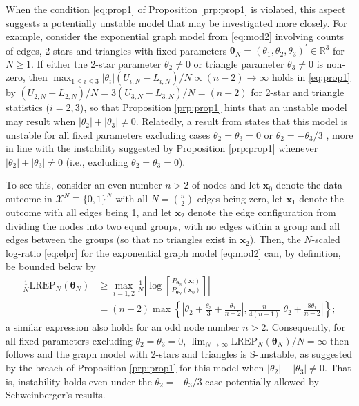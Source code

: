 \documentclass[numbib]{imamat}
\theoremstyle{theorem}
\theoremstyle{lemma}
\theoremstyle{example}
\theoremstyle{corollary}
\theoremstyle{definition}
\theoremstyle{remark}
\theoremstyle{approximation}
\theoremstyle{scheme}
\newcommand{\REP}{\mathrm{LREP}}
\newcommand{\ak}[1]{{\color{blue} #1}}
\begin{document}
When the condition \eqref{eq:prop1} of Proposition \ref{prp:prop1} is violated, this aspect suggests a potentially unstable model that may be investigated more closely. For example, consider the exponential graph model from \eqref{eq:mod2} involving counts of edges, 2-stars and triangles with fixed parameters \(\boldsymbol \theta_N = (\theta_{1},\theta_2,\theta_3)^\prime \in \mathbb{R}^3\) for \(N\geq 1\). If either the 2-star parameter \(\theta_2 \neq 0\) or triangle parameter \(\theta_3 \neq 0\) is non-zero, then \(\max_{1 \leq i \leq 3 } |\theta_{i}|(U_{i,N}-L_{i,N})/N \propto (n-2)\to \infty\) holds in \eqref{eq:prop1} by \((U_{2,N}-L_{2,N})/N = 3 (U_{3,N}-L_{3,N})/N=(n-2)\) for 2-star and triangle statistics (\(i=2,3\)), so that Proposition \ref{prp:prop1} hints that an unstable model may result when \(|\theta_2| + |\theta_3| \neq 0\). Relatedly, a result from \citet[Result 3]{schweinberger2011instability} states that this model is unstable for all fixed parameters excluding cases \(\theta_2 =\theta_3=0\) or \(\theta_2 = - \theta_3/3\)\ak{, more in line} with the instability suggested by Proposition \ref{prp:prop1} whenever \(|\theta_2| + |\theta_3| \neq 0\) (i.e., excluding \(\theta_2 =\theta_3=0\)).

To see this, consider an even number \(n>2\) of nodes and let \(\boldsymbol x_0\) denote the data outcome in \(\mathcal{X}^N \equiv \{0,1\}^N\) with all \(N = {n \choose 2}\) edges being zero, let \(\boldsymbol x_1\) denote the outcome with all edges being 1, and let \(\boldsymbol x_2\) denote the edge configuration from dividing the nodes into two equal groups, with no edges within a group and all edges between the groups (so that no triangles exist in \(\boldsymbol x_2\)). Then, the \(N\)-scaled log-ratio \eqref{eq:elpr} for the exponential graph model \eqref{eq:mod2} can, by definition, be bounded below by
\begin{align*}
\frac{1}{N}\REP_N(\boldsymbol \theta_N) &\geq \max_{i=1,2}\frac{1}{N}
\left| \log\left[ \frac{P_{\boldsymbol \theta_N}(\boldsymbol x_i)}{P_{\boldsymbol \theta_N}(\boldsymbol x_0)}\right] \right| \\
&= (n-2) \max\left\{ \left| \theta_2 + \frac{\theta_3}{3}+\frac{\theta_1}{n-2} \right|, \frac{n}{4(n-1)} \left| \theta_2 + \frac{8\theta_1}{n-2} \right| \right\};
\end{align*}
a similar expression also holds for an odd node number \(n>2\). Consequently, for all fixed parameters excluding \(\theta_2=\theta_3=0\), \(\lim_{N\to \infty}\REP_N(\boldsymbol \theta_N)/N=\infty\) then follows and the graph model with 2-stars and triangles is S-unstable, as suggested by the breach of Proposition \ref{prp:prop1} for this model when \(|\theta_2|+|\theta_3|\neq 0\). That is, instability holds even under \ak{the} \(\theta_2 = - \theta_3/3\) case potentially allowed by Schweinberger's \citeyearpar{schweinberger2011instability} results.
\end{document}
